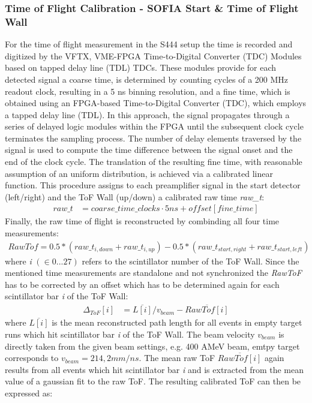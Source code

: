 \subsubsection{Time of Flight Calibration -  SOFIA Start \& Time of Flight Wall}
For the time of flight measurement in the S444 setup the time is recorded and digitized by the VFTX,  VME-FPGA Time-to-Digital Converter (TDC) Modules based on tapped delay line (TDL) TDCs\cite{bayer2009development}. These modules provide for each detected signal a coarse time, is determined by counting cycles of a 200 MHz readout clock, resulting in a 5 ns binning resolution, and a fine time, which is obtained using an FPGA-based Time-to-Digital Converter (TDC), which employs a tapped delay line (TDL). In this approach, the signal propagates through a series of delayed logic modules within the FPGA until the subsequent clock cycle terminates the sampling process. The number of delay elements traversed by the signal is used to compute the time difference between the signal onset and the end of the clock cycle. The translation of the resulting fine time, with reasonable assumption of an uniform distribution, is achieved via a calibrated linear function. This procedure assigns to each preamplifier signal in the start detector (left/right) and the ToF Wall (up/down) a calibrated raw time \textit{raw\_t}:
\begin{align*}
raw\_t &= coarse\_time\_clocks  \cdot 5ns + offset[fine\_time]
\end{align*}
Finally, the raw time of flight is reconstructed by combinding all four time measurements:
\begin{gather}
RawTof = 0.5*(raw\_t_{i,down}+raw\_t_{i,up}) - 0.5*(raw\_t_{start,right}+raw\_t_{start,left})
\end{gather}
where \textit{i} $(\in 0...27)$ refers to the scintillator number of the ToF Wall. Since the mentioned time measurements are standalone and not synchronized the \textit{RawToF} has to be corrected by an offset which has to be determined again for each scintillator bar \textit{i} of the ToF Wall:
\begin{align*}
\Delta_{ToF}[i] &= \overline{L[i]}/v_{beam} - \overline{RawTof[i]}
\end{align*} 
where $\overline{L[i]}$ is the mean reconstructed path length for all events in empty target runs which hit scintillator bar \textit{i} of the ToF Wall. The beam velocity $v_{beam}$ is directly taken from the given beam settings, e.g. 400 AMeV beam, emtpy target corresponds to $v_{beam} = 214,2mm/ns$. The mean raw ToF $\overline{RawTof[i]}$ again results from all events which hit scintillator bar \textit{i} and is extracted from the mean value of a gaussian fit to the raw ToF. The resulting calibrated ToF can then be expressed as:
